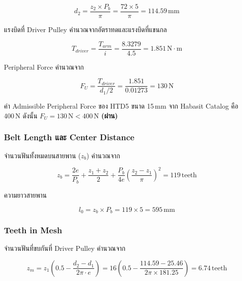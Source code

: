 \begin{equation}
  d_2 = \frac{z_2 \times P_b}{\pi}
      = \frac{72 \times 5}{\pi}
      = 114.59\,\text{mm}
  \label{eq:belt_d2}
\end{equation}

แรงบิดที่ Driver Pulley คำนวณจากอัตราทดและแรงบิดที่แขนกล

\begin{equation}
  T_{driver} = \frac{T_{arm}}{i}
             = \frac{8.3279}{4.5}
             = 1.851\,\text{N}\cdot\text{m}
  \label{eq:belt_torque}
\end{equation}

Peripheral Force คำนวณจาก

\begin{equation}
  F_U = \frac{T_{driver}}{d_1/2}
      = \frac{1.851}{0.01273}
      = 130\,\text{N}
  \label{eq:belt_fu}
\end{equation}

ค่า Admissible Peripheral Force ของ HTD5 ขนาด 15\,mm
จาก Habasit Catalog คือ 400\,N
ดังนั้น $F_U = 130\,\text{N} < 400\,\text{N}$
\textbf{(ผ่าน)}

\subsubsection{Belt Length และ Center Distance}

จำนวนฟันทั้งหมดบนสายพาน ($z_b$) คำนวณจาก

\begin{equation}
  z_b = \frac{2e}{P_b}
      + \frac{z_1 + z_2}{2}
      + \frac{P_b}{4e}\left(\frac{z_2 - z_1}{\pi}\right)^2
      = 119\,\text{teeth}
  \label{eq:belt_zb}
\end{equation}

ความยาวสายพาน

\begin{equation}
  l_0 = z_b \times P_b = 119 \times 5 = 595\,\text{mm}
  \label{eq:belt_length}
\end{equation}

\subsubsection{Teeth in Mesh}

จำนวนฟันที่ขบกันที่ Driver Pulley คำนวณจาก

\begin{equation}
  z_m = z_1 \left(0.5 - \frac{d_2 - d_1}{2\pi \cdot e}\right)
      = 16 \left(0.5 - \frac{114.59 - 25.46}{2\pi \times 181.25}\right)
      = 6.74\,\text{teeth}
  \label{eq:belt_zm}
\end{equation}


